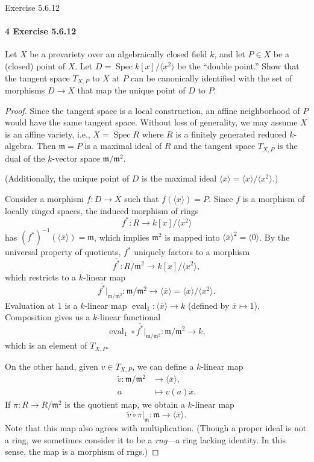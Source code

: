 \documentclass[12pt]{article}
\newlength{\myparskip}
\newenvironment{fullbox}{\begin{lrbox}{\savefullbox}\begin{minipage}{\dimexpr\textwidth-2\fboxsep\relax}\setlength{\parskip}{\myparskip}}{\end{minipage}\end{lrbox}\framebox[\textwidth]{\usebox{\savefullbox}}}
\newenvironment{pbox}[1][]{\begin{fullbox}\ifx#1\empty\else\paragraph{#1}\phantom{}\fi}{\end{fullbox}}
\theoremstyle{definition}
\newcommand{\<}{\langle}
\renewcommand{\>}{\rangle}
\newcommand{\eqc}{\overline}
\DeclareMathOperator{\Spec}{Spec}
\newcommand{\mm}{\mathfrak{m}}
\begin{document}
\newpage
\begin{pbox}[4 Exercise 5.6.12]
    Let $X$ be a prevariety over an algebraically closed field $k$, and let $P \in X$ be a (closed) point of $X$.
    Let $D = \Spec k[x]/\<x^2\>$ be the ``double point.''
    Show that the tangent space $T_{X, P}$ to $X$ at $P$ can be canonically identified with the set of morphisms $D \to X$ that map the unique point of $D$ to $P$.
\end{pbox}

\begin{proof}
    Since the tangent space is a local construction, an affine neighborhood of $P$ would have the same tangent space.
    Without loss of generality, we may assume $X$ is an affine variety, i.e., $X = \Spec R$ where $R$ is a finitely generated reduced $k$-algebra.
    Then $\mm = P$ is a maximal ideal of $R$ and the tangent space $T_{X, P}$ is the dual of the $k$-vector space $\mm/\mm^2$.

    (Additionally, the unique point of $D$ is the maximal ideal $\<\eqc{x}\> = \<x\>/\<x^2\>$.)

    Consider a morphism $f : D \to X$ such that $f(\<x\>) = P$.
    Since $f$ is a morphism of locally ringed spaces, the induced morphism of rings
    \[
        f^* : R \longrightarrow k[x]/\<x^2\>
    \]
    has $(f^*)^{-1}(\<\eqc{x}\>) = \mm$, which implies $\mm^2$ is mapped into $\<\eqc{x}\>^2 = \<0\>$.
    By the universal property of quotients, $f^*$ uniquely factors to a morphism
    \[
        \eqc{f^*} : R/\mm^2 \longrightarrow k[x]/\<x^2\>,
    \]
    which restricts to a $k$-linear map
    \[
        \eqc{f^*}|_{\mm/\mm^2} : \mm/\mm^2 \longrightarrow \<\eqc{x}\> = \<x\>/\<x^2\>.
    \]
    Evaluation at $1$ is a $k$-linear map $\operatorname{eval}_1 : \<\eqc{x}\> \to k$ (defined by $\eqc{x} \mapsto 1$).
    Composition gives us a $k$-linear functional
    \[
        \operatorname{eval}_1 \circ \eqc{f^*}|_{\mm/\mm^2} : \mm/\mm^2 \longrightarrow k,
    \]
    which is an element of $T_{X, P}$.
    

    On the other hand, given $v \in T_{X, P}$, we can define a $k$-linear map
    \begin{align*}
        \tilde{v} : \mm/\mm^2 &\longrightarrow \<\eqc{x}\>, \\
            a &\longmapsto v(a)\eqc{x}.
    \end{align*}
    If $\pi : R \to R/\mm^2$ is the quotient map, we obtain a $k$-linear map
    \[
        \tilde{v} \circ \pi|_{\mm} : \mm \longrightarrow \<\eqc{x}\>.
    \]
    Note that this map also agrees with multiplication.
    (Though a proper ideal is not a ring, we sometimes consider it to be a \textit{rng}---a ring lacking identity. 
    In this sense, the map is a morphism of rngs.)


\end{proof}
\end{document}

